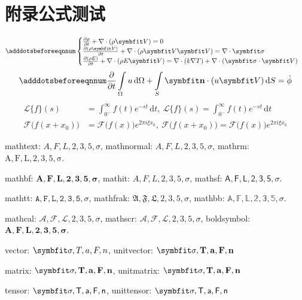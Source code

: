 
\chapter[附录：公式测试]{附录\quad 公式测试}

\begin{equation} \label{eq:appedns}
    \adddotsbeforeeqnnum
    \begin{cases}
        \frac{\partial \rho}{\partial t} + \nabla\cdot(\rho\Vector{V}) = 0\\
        \frac{\partial (\rho\Vector{V})}{\partial t} + \nabla\cdot(\rho\Vector{V}\Vector{V}) = \nabla\cdot\Tensor{\sigma}\\
        \frac{\partial (\rho E)}{\partial t} + \nabla\cdot(\rho E\Vector{V}) = \nabla\cdot(k\nabla T) + \nabla\cdot(\Tensor{\sigma}\cdot\Vector{V})
    \end{cases}
    \nonumber
\end{equation}
\begin{equation}
    \adddotsbeforeeqnnum
    \frac{\partial }{\partial t}\int\limits_{\Omega} u \, \mathrm{d}\Omega + \int\limits_{S} \unitVector{n}\cdot(u\Vector{V}) \, \mathrm{d}S = \dot{\phi}
    \nonumber
\end{equation}
\[
    \begin{split}
        \mathcal{L} \{f\}(s) &= \int _{0^{-}}^{\infty} f(t) e^{-st} \, \mathrm{d}t, \ 
        \mathscr{L} \{f\}(s) = \int _{0^{-}}^{\infty} f(t) e^{-st} \, \mathrm{d}t\\
        \mathcal{F} {\bigl (} f(x+x_{0}) {\bigr )} &= \mathcal{F} {\bigl (} f(x) {\bigr )} e^{2\pi i\xi x_{0}}, \ 
        \mathscr{F} {\bigl (} f(x+x_{0}) {\bigr )} = \mathscr{F} {\bigl (} f(x) {\bigr )} e^{2\pi i\xi x_{0}}
    \end{split}
\]

mathtext: $A,F,L,2,3,5,\sigma$, mathnormal: $A,F,L,2,3,5,\sigma$, mathrm: $\mathrm{A,F,L,2,3,5,\sigma}$.

mathbf: $\mathbf{A,F,L,2,3,5,\sigma}$, mathit: $\mathit{A,F,L,2,3,5,\sigma}$, mathsf: $\mathsf{A,F,L,2,3,5,\sigma}$.

mathtt: $\mathtt{A,F,L,2,3,5,\sigma}$, mathfrak: $\mathfrak{A,F,L,2,3,5,\sigma}$, mathbb: $\mathbb{A,F,L,2,3,5,\sigma}$.

mathcal: $\mathcal{A,F,L,2,3,5,\sigma}$, mathscr: $\mathscr{A,F,L,2,3,5,\sigma}$, boldsymbol: $\boldsymbol{A,F,L,2,3,5,\sigma}$.

vector: $\Vector{\sigma, T, a, F, n}$, unitvector: $\unitVector{\sigma, T, a, F, n}$

matrix: $\Matrix{\sigma, T, a, F, n}$, unitmatrix: $\unitMatrix{\sigma, T, a, F, n}$

tensor: $\Tensor{\sigma, T, a, F, n}$, unittensor: $\unitTensor{\sigma, T, a, F, n}$ 


